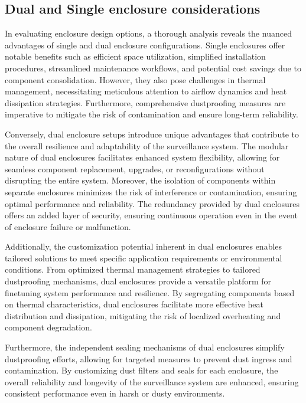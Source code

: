 \documentclass[class=report,11pt,crop=false]{standalone}
\begin{document}
\subsection{Dual and Single enclosure considerations}
In evaluating enclosure design options, a thorough analysis reveals the nuanced advantages of single and dual enclosure configurations. Single enclosures offer notable benefits such as efficient space utilization, simplified installation procedures, streamlined maintenance workflows, and potential cost savings due to component consolidation. However, they also pose challenges in thermal management, necessitating meticulous attention to airflow dynamics and heat dissipation strategies. Furthermore, comprehensive dustproofing measures are imperative to mitigate the risk of contamination and ensure long-term reliability.
\newline

Conversely, dual enclosure setups introduce unique advantages that contribute to the overall resilience and adaptability of the surveillance system. The modular nature of dual enclosures facilitates enhanced system flexibility, allowing for seamless component replacement, upgrades, or reconfigurations without disrupting the entire system. Moreover, the isolation of components within separate enclosures minimizes the risk of interference or contamination, ensuring optimal performance and reliability. The redundancy provided by dual enclosures offers an added layer of security, ensuring continuous operation even in the event of enclosure failure or malfunction.
\newline

Additionally, the customization potential inherent in dual enclosures enables tailored solutions to meet specific application requirements or environmental conditions. From optimized thermal management strategies to tailored dustproofing mechanisms, dual enclosures provide a versatile platform for finetuning system performance and resilience. By segregating components based on thermal characteristics, dual enclosures facilitate more effective heat distribution and dissipation, mitigating the risk of localized overheating and component degradation.
\newline

Furthermore, the independent sealing mechanisms of dual enclosures simplify dustproofing efforts, allowing for targeted measures to prevent dust ingress and contamination. By customizing dust filters and seals for each enclosure, the overall reliability and longevity of the surveillance system are enhanced, ensuring consistent performance even in harsh or dusty environments.
\end{document}

